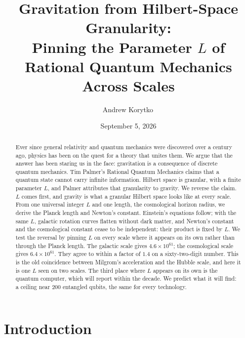 \documentclass[aps,prd,twocolumn,superscriptaddress,nofootinbib,showkeys]{revtex4-2}
\begin{document}
\title{Gravitation from Hilbert-Space Granularity:\\ Pinning the Parameter $L$ of Rational Quantum Mechanics Across Scales}

\author{Andrew Korytko\,}

\date{September 5, 2026}

\begin{abstract}
Ever since general relativity and quantum mechanics were discovered over a century ago, physics has been on the quest for a theory that unites them. We argue that the answer has been staring us in the face: gravitation is a consequence of discrete quantum mechanics. Tim Palmer's Rational Quantum Mechanics claims that a quantum state cannot carry infinite information. Hilbert space is granular, with a finite parameter $L$, and Palmer attributes that granularity to gravity. We reverse the claim. $L$ comes first, and gravity is what a granular Hilbert space looks like at every scale. From one universal integer $L$ and one length, the cosmological horizon radius, we derive the Planck length and Newton's constant. Einstein's equations follow; with the same $L$, galactic rotation curves flatten without dark matter, and Newton's constant and the cosmological constant cease to be independent: their product is fixed by $L$. We test the reversal by pinning $L$ on every scale where it appears on its own rather than through the Planck length. The galactic scale gives $4.6\times10^{61}$; the cosmological scale gives $6.4\times10^{61}$. They agree to within a factor of $1.4$ on a sixty-two-digit number. This is the old coincidence between Milgrom's acceleration and the Hubble scale, and here it is one $L$ seen on two scales. The third place where $L$ appears on its own is the quantum computer, which will report within the decade. We predict what it will find: a ceiling near $200$ entangled qubits, the same for every technology.
\end{abstract}


\maketitle

\section{Introduction}
\end{document}
